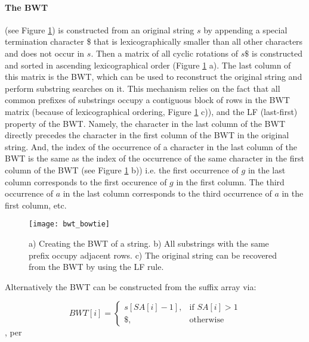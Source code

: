 \paragraph{The BWT} (see Figure \ref{fig:bwt_bowtie}) is constructed from an original string $s$ by appending a special termination character \$ that is lexicographically smaller than all other characters and does not occur in $s$. Then a matrix of all cyclic rotations of $s\$$ is constructed and sorted in ascending lexicographical order (Figure \ref{fig:bwt_bowtie} a). The last column of this matrix is the BWT, which can be used to reconstruct the original string and perform substring searches on it. This mechanism relies on the fact that all common prefixes of substrings occupy a contiguous block of rows in the BWT matrix (because of lexicographical ordering, Figure \ref{fig:bwt_bowtie} c)), and the LF (last-first) property of the BWT. Namely, the character in the last column of the BWT directly precedes the character in the first column of the BWT in the original string. And, the index of the occurrence of a character in the last column of the BWT is the same as the index of the occurrence of the same character in the first column of the BWT (see Figure \ref{fig:bwt_bowtie} b)) i.e. the first occurrence of $g$ in the last column corresponds to the first occurence of $g$ in the first column. The third occurrence of $a$ in the last column corresponds to the third occurrence of $a$ in the first column, etc.

\begin{figure}[H]
    \texttt{[image: bwt\_bowtie]}
    \centering
    \caption {a) Creating the BWT of a string. b) All substrings with the same prefix occupy adjacent rows. c) The original string can be recovered from the BWT by using the LF rule.\autocite{langmead2009ultrafast}}
    \label{fig:bwt_bowtie}
\end{figure}

Alternatively the BWT can be constructed from the suffix array via:

\begin{equation}
    BWT[i] = \begin{cases}
        s[SA[i] - 1],& \text{if } SA[i] > 1\\
        \$,& \text{otherwise}
    \end{cases}
\end{equation}, per \autocite{simpson2010efficient}

